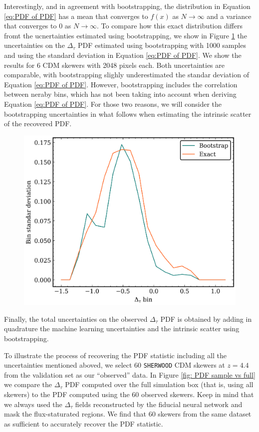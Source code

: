 Interestingly, and in agreement with bootstrapping, the distribution in Equation \ref{eq:PDF of PDF} has a mean that converges to $f(x)$ as $N\to \infty$ and a variance that converges to 0 as $N\to \infty$. To compare how this exact distribution differs fromt the ucnertainties estimated using bootstrapping, we show in Figure \ref{fig: boot vs exact} the uncertainties on the $\Delta_\tau$ PDF estimated using bootstrapping with 1000 samples and using the standard deviation in Equation \ref{eq:PDF of PDF}. We show the results for 6 CDM skewers with 2048 pixels each.
Both uncertainties are comparable, with bootstrapping slighly underestimated the standar deviation of Equation \ref{eq:PDF of PDF}. However, bootstrapping includes the correlation between neraby bins, which has not been taking into account when deriving Equation \ref{eq:PDF of PDF}. For those two reasons, we will consider the bootstrapping uncertainties in what follows when estimating the intrinsic scatter of the recovered PDF.
\begin{figure}
    \centering
    \includegraphics[width=0.85\linewidth]{img/ML/boot_vs_exxact.png}
    \caption{}
    \label{fig: boot vs exact}
\end{figure}

Finally, the total uncertainties on the observed $\Delta_\tau$ PDF is obtained by adding in quadrature the machine learning uncertainties and the intrinsic scatter using bootstrapping.

To illustrate the process of recovering the PDF statistic including all the uncertainties mentioned aboved, we select 60 \texttt{SHERWOOD} CDM skewers at $z=4.4$ from the validation set as our ``observed'' data. In Figure \ref{fig: PDF sample vs full} we compare the $\Delta_\tau$ PDF computed over the full simulation box (that is, using all skewers) to the PDF computed using the 60 observed skewers. Keep in mind that we always used the $\Delta_\tau$ fields reconstructed by the fiducial neural network and mask the flux-staturated regions.
We find that 60 skewers from the same dataset as sufficient to accurately recover the PDF statistic.

